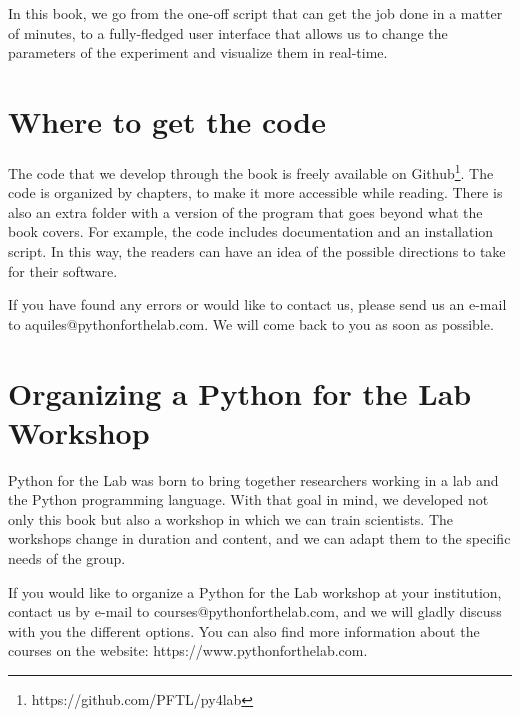In this book, we go from the one-off script that can get the job done in a matter of minutes, to a fully-fledged user interface that allows us to change the parameters of the experiment and visualize them in real-time.

\section{Where to get the code}\label{sec:where-to-get-the-code}
The code that we develop through the book is freely available on Github\footnote{https://github.com/PFTL/py4lab}. The code is organized by chapters, to make it more accessible while reading. There is also an extra folder with a version of the program that goes beyond what the book covers. For example, the code includes documentation and an installation script. In this way, the readers can have an idea of the possible directions to take for their software.

\sloppy If you have found any errors or would like to contact us, please send us an e-mail to {aquiles@pythonforthelab.com}. We will come back to you as soon as possible.

\section{Organizing a Python for the Lab Workshop}\label{sec:organizing-a-python-for-the-lab-workshop}
Python for the Lab was born to bring together researchers working in a lab and the Python programming language. With that goal in mind, we developed not only this book but also a workshop in which we can train scientists. The workshops change in duration and content, and we can adapt them to the specific needs of the group.

\sloppy If you would like to organize a Python for the Lab workshop at your institution, contact us by e-mail to {courses@pythonforthelab.com}, and we will gladly discuss with you the different options. You can also find more information about the courses on the website: {https://www.pythonforthelab.com}.
